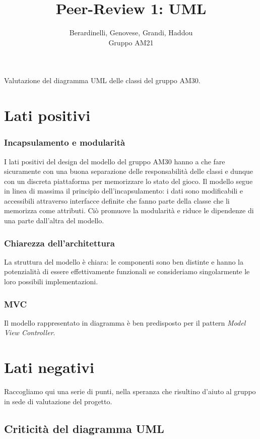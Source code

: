 \documentclass[12pt]{article}
\title{Peer-Review 1: UML}
\author{Berardinelli, Genovese, Grandi, Haddou\\Gruppo AM21}
\begin{document}
\maketitle
\tableofcontents
\begin{center}
Valutazione del diagramma UML delle classi del gruppo AM30.
\end{center}
\newpage

\section{Lati positivi}
\subsubsection{Incapsulamento e modularità}
I lati positivi del design del modello del gruppo AM30 hanno a che fare sicuramente con una buona separazione delle responsabilità delle classi e dunque con un discreta piattaforma per memorizzare lo stato del gioco.
Il modello segue in linea di massima il principio dell'incapsulamento: i dati sono modificabili e accessibili attraverso interfacce definite che fanno parte della classe che li memorizza come attributi. Ciò promuove la modularità e riduce le dipendenze di una parte dall'altra del modello.

\subsubsection{Chiarezza dell'architettura } La struttura del modello è chiara: le componenti sono ben distinte e hanno la potenzialità di essere effettivamente funzionali se consideriamo singolarmente le loro possibili implementazioni.

\subsubsection{MVC} Il modello rappresentato in diagramma è ben predisposto per il pattern \textit{Model View Controller}.


\section{Lati negativi}
Raccogliamo qui una serie di punti, nella speranza che risultino d'aiuto al gruppo in sede di valutazione del progetto.  
\subsection{Criticità del diagramma UML}
\end{document}
